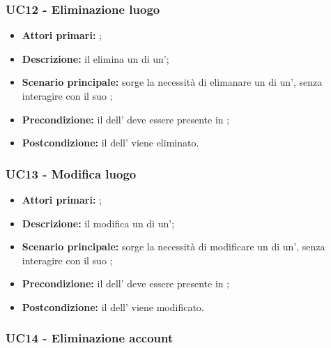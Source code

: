 \documentclass[casi-duso]{subfiles}
\begin{document}
\subsubsection{UC12 - Eliminazione luogo}
\label{subsub:UC12}

\begin{itemize}
  \item \textbf{Attori primari:} ;
  \item \textbf{Descrizione:} il  elimina un  di un';
  \item \textbf{Scenario principale:} sorge la necessità di elimanare un  di un', senza interagire con il suo ;
  \item \textbf{Precondizione:} il  dell' deve essere presente in ;
  \item \textbf{Postcondizione:} il  dell' viene eliminato.

\end{itemize}

\subsubsection{UC13 - Modifica luogo}
\label{subsub:UC13}

\begin{itemize}
  \item \textbf{Attori primari:} ;
  \item \textbf{Descrizione:} il  modifica un  di un';
  \item \textbf{Scenario principale:} sorge la necessità di modificare un  di un', senza interagire con il suo ;
  \item \textbf{Precondizione:} il  dell' deve essere presente in ;
  \item \textbf{Postcondizione:} il  dell' viene modificato.

\end{itemize}

\subsubsection{UC14 - Eliminazione account}
\label{subsub:UC14}
\end{document}
